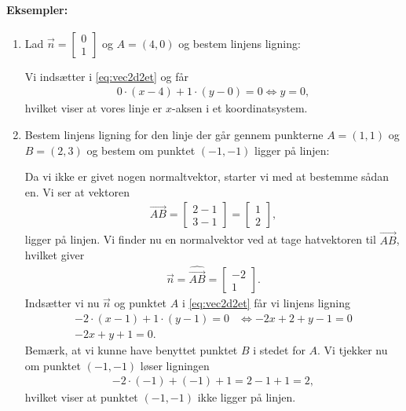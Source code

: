 \paragraph*{Eksempler:}
\begin{enumerate}
\item Lad $\vec{n}=\begin{bmatrix}0 \\ 1\end{bmatrix}$ og $A=(4,0)$ og bestem linjens ligning:

Vi indsætter i \eqref{eq:vec2d2et} og får
\begin{align*}
0 \cdot (x - 4) + 1 \cdot (y-0) = 0 \Leftrightarrow y=0,
\end{align*}
hvilket viser at vores linje er $x$-aksen i et koordinatsystem.
\item Bestem linjens ligning for den linje der går gennem punkterne $A=(1,1)$ og $B=(2,3)$ og bestem om punktet $(-1,-1)$ ligger på linjen:

Da vi ikke er givet nogen normaltvektor, starter vi med at bestemme sådan en. Vi ser at vektoren
\begin{align*}
\overrightarrow{AB} = \begin{bmatrix} 2-1 \\ 3-1 \end{bmatrix}= \begin{bmatrix} 1 \\ 2 \end{bmatrix},
\end{align*}
ligger på linjen. Vi finder nu en normalvektor ved at tage hatvektoren til $\overrightarrow{AB}$, hvilket giver
\begin{align*}
\vec{n}=\hat{\overrightarrow{AB}}=\begin{bmatrix} -2 \\ 1 \end{bmatrix}.
\end{align*}
Indsætter vi nu $\vec{n}$ og punktet $A$ i \eqref{eq:vec2d2et} får vi linjens ligning
\begin{align*}
-2\cdot (x-1)+1 \cdot (y-1) = 0 &\Leftrightarrow -2x +2 +y -1 = 0 \\
-2x+y+1=0.
\end{align*}
Bemærk, at vi kunne have benyttet punktet $B$ i stedet for $A$. Vi tjekker nu om punktet $(-1,-1)$ løser ligningen
\begin{align*}
-2 \cdot(-1) + (-1) +1 = 2 - 1+1 = 2,
\end{align*}
hvilket viser at punktet $(-1,-1)$ ikke ligger på linjen.
\end{enumerate}

